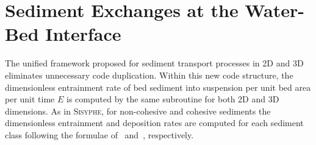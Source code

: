 \chapter[Sediment Exchanges at the Water-Bed Interface]{Sediment Exchanges at the Water-Bed Interface}

The unified framework proposed for sediment transport processes in 2D and 3D eliminates unnecessary code duplication. Within this new code structure, the dimensionless entrainment rate of bed sediment into suspension per unit bed area per unit time $E$ is computed by the same subroutine for both 2D and 3D dimensions. As in \textsc{Sisyphe}, for non-cohesive and cohesive sediments the dimensionless entrainment and deposition rates are computed for each sediment class following the formulae of~\cite{wu2007computational} and~\cite{partheniades1965erosion,krone1962flume}, respectively. %



